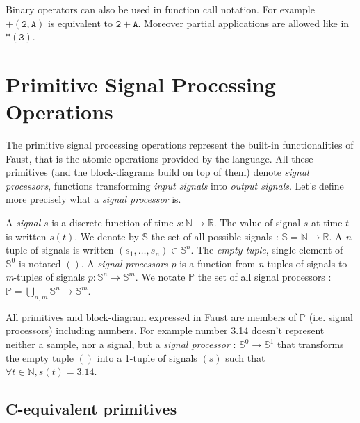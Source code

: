 \documentclass{article}
\begin{document}
\vspace{5 mm}

Binary operators can also be used in function call notation.
For example $\mathtt{+(2,A)}$ is equivalent to $\mathtt{2+A}$.
Moreover partial applications are allowed like in $\mathtt{*(3)}$.





\section{Primitive Signal Processing Operations}
The primitive signal processing operations represent the built-in functionalities of Faust, that is the atomic operations provided by the language.
All these primitives (and the block-diagrams build on top of them) denote \emph{signal processors}, functions transforming \emph{input signals} into \emph{output signals}.
Let's define more precisely what a \emph{signal processor} is.

A \emph{signal} $s$ is a discrete function of time
$s:\mathbb{N}\rightarrow\mathbb{R}$. The value of signal $s$ at time $t$
is written $s(t)$. We denote by $\mathbb{S}$ the set of all possible  signals :
$\mathbb{S}=\mathbb{N}\rightarrow\mathbb{R}$.
%
A \emph{n}-tuple of signals is written
$(s_{1},\ldots,s_{n})\in \mathbb{S}^{n}$.
The \emph{empty tuple}, single element of $\mathbb{S}^{0}$ is notated  $()$.
%
A \emph{signal processors} $p$ is a function from
\emph{n}-tuples of signals to \emph{m}-tuples of signals
$p:\mathbb{S}^{n}\rightarrow\mathbb{S}^{m}$. We notate $\mathbb{P}$ the
set of all signal processors :
$\mathbb{P}=\bigcup_{n,m}\mathbb{S}^{n}\rightarrow\mathbb{S}^{m}$.

All primitives and block-diagram expressed in Faust are members of $\mathbb{P}$ (i.e. signal processors) including numbers.
For example number 3.14 doesn't represent neither a sample, nor a signal, but a \emph{signal processor} : $\mathbb{S}^{0}\rightarrow\mathbb{S}^{1}$ that transforms the empty tuple $()$ into a 1-tuple of signals $(s)$ such that $\forall t\in\mathbb{N}, s(t)=3.14$.

\subsection{C-equivalent primitives}
\end{document}
